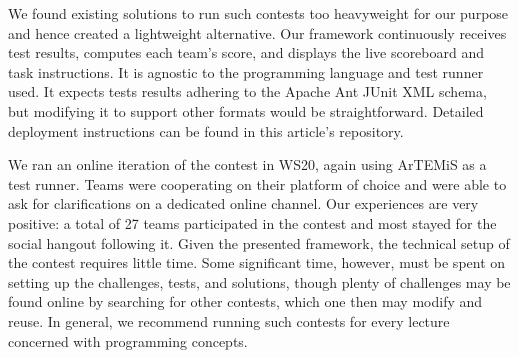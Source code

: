 We found existing solutions
to run such contests too heavyweight for our purpose
and hence created a lightweight alternative.
Our framework continuously receives test results,
computes each team's score,
and displays the live scoreboard and task instructions.
It is agnostic to the programming language and test runner used.
It expects tests results adhering to the Apache Ant JUnit XML schema,
but modifying it to support other formats would be straightforward.
Detailed deployment instructions can be found in this article's repository.

We ran an online iteration of the contest in WS20,
again using ArTEMiS as a test runner.
Teams were cooperating on their platform of choice
and were able to ask for clarifications on a dedicated online channel.
Our experiences are very positive:
a total of 27 teams participated in the contest
and most stayed for the social hangout following it.
Given the presented framework,
the technical setup of the contest requires little time.
Some significant time, however,
must be spent on setting up the challenges,
tests, and solutions,
though plenty of challenges may be found
online by searching for other contests,
which one then may modify and reuse.
In general, we recommend running such contests
for every lecture concerned with programming concepts.



